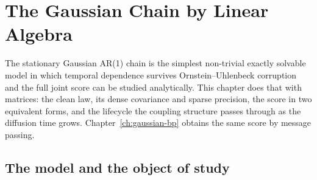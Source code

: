 %

\chapter{The Gaussian Chain by Linear Algebra}
\label{ch:gaussian}\label{ch:model}\label{ch:background}

The stationary Gaussian AR(1) chain is the simplest non-trivial exactly
solvable model in which temporal dependence survives Ornstein--Uhlenbeck
corruption and the full joint score can be studied analytically. This chapter
does that with matrices: the clean law, its dense covariance and sparse
precision, the score in two equivalent forms, and the lifecycle the coupling
structure passes through as the diffusion time grows. Chapter~\ref{ch:gaussian-bp}
obtains the same score by message passing.

\section{The model and the object of study}
\label{sec:g-model}\label{sec:markov}\label{sec:ou}\label{sec:stationarity}

